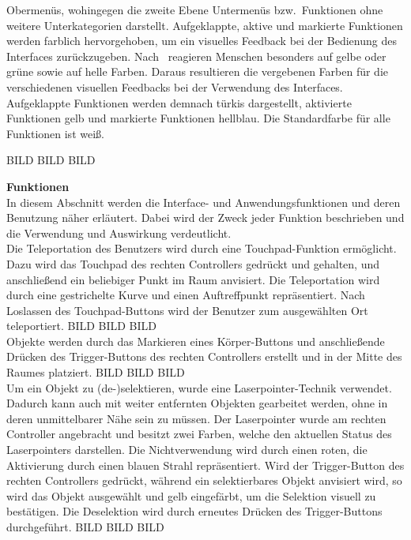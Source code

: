Obermenüs, wohingegen die zweite Ebene Untermenüs bzw.~Funktionen ohne weitere Unterkategorien darstellt. Aufgeklappte, aktive und markierte Funktionen werden farblich hervorgehoben, um ein visuelles Feedback bei der Bedienung des Interfaces zurückzugeben. Nach~\citep{colors} reagieren Menschen besonders auf gelbe oder grüne sowie auf helle Farben. Daraus resultieren die vergebenen Farben für die verschiedenen visuellen Feedbacks bei der Verwendung des Interfaces. Aufgeklappte Funktionen werden demnach türkis dargestellt, aktivierte Funktionen gelb und markierte Funktionen hellblau. Die Standardfarbe für alle Funktionen ist weiß.

BILD BILD BILD


\noindent \textbf{Funktionen}\\
In diesem Abschnitt werden die Interface- und Anwendungsfunktionen und deren Benutzung näher erläutert. Dabei wird der Zweck jeder Funktion beschrieben und die Verwendung und Auswirkung verdeutlicht.\\
Die Teleportation des Benutzers wird durch eine Touchpad-Funktion ermöglicht. Dazu wird das Touchpad des rechten Controllers gedrückt und gehalten, und anschließend ein beliebiger Punkt im Raum anvisiert. Die Teleportation wird durch eine gestrichelte Kurve und einen Auftreffpunkt repräsentiert. Nach Loslassen des Touchpad-Buttons wird der Benutzer zum ausgewählten Ort teleportiert.
BILD BILD BILD\\
Objekte werden durch das Markieren eines Körper-Buttons und anschließende Drücken des Trigger-Buttons des rechten Controllers erstellt und in der Mitte des Raumes platziert.
BILD BILD BILD\\
Um ein Objekt zu (de-)selektieren, wurde eine Laserpointer-Technik verwendet. Dadurch kann auch mit weiter entfernten Objekten gearbeitet werden, ohne in deren unmittelbarer Nähe sein zu müssen. Der Laserpointer wurde am rechten Controller angebracht und besitzt zwei Farben, welche den aktuellen Status des Laserpointers darstellen. Die Nichtverwendung wird durch einen roten, die Aktivierung durch einen blauen Strahl repräsentiert. Wird der Trigger-Button des rechten Controllers gedrückt, während ein selektierbares Objekt anvisiert wird, so wird das Objekt ausgewählt und gelb eingefärbt, um die Selektion visuell zu bestätigen. Die Deselektion wird durch erneutes Drücken des Trigger-Buttons durchgeführt.
BILD BILD BILD\\
